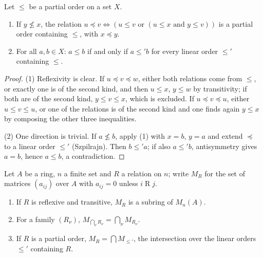 \begin{encadre}
\begin{theoreme}\label{thm:quillen-1973-5}
Let $\le$ be a partial order on a set $X$.
\begin{enumerate}
\item If $y \not\le x$, the relation $u \preceq v \iff (u \le v \text{ or } (u \le x \text{ and } y \le v))$ is a partial order containing $\le$, with $x \preceq y$.
\item For all $a, b \in X$: $a \le b$ if and only if $a \le' b$ for every linear order $\le'$ containing $\le$.
\end{enumerate}
\end{theoreme}
\end{encadre}

\begin{proof}
(1) Reflexivity is clear. If $u \preceq v \preceq w$, either both relations come from $\le$, or exactly one is of the second kind, and then $u \le x$, $y \le w$ by transitivity; if both are of the second kind, $y \le v \le x$, which is excluded. If $u \preceq v \preceq u$, either $u \le v \le u$, or one of the relations is of the second kind and one finds again $y \le x$ by composing the other three inequalities.

(2) One direction is trivial. If $a \not\le b$, apply (1) with $x = b$, $y = a$ and extend $\preceq$ to a linear order $\le'$ (Szpilrajn). Then $b \le' a$; if also $a \le' b$, antisymmetry gives $a = b$, hence $a \le b$, a contradiction.
\end{proof}

\begin{encadre}
\begin{theoreme}\label{thm:quillen-1973-5-b}
Let $A$ be a ring, $n$ a finite set and $R$ a relation on $n$; write $M_R$ for the set of matrices $(a_{ij})$ over $A$ with $a_{ij} = 0$ unless $i \mathrel{R} j$.
\begin{enumerate}
\item If $R$ is reflexive and transitive, $M_R$ is a subring of $M_n(A)$.
\item For a family $(R_\nu)$, $M_{\bigcap_\nu R_\nu} = \bigcap_\nu M_{R_\nu}$.
\item If $R$ is a partial order, $M_R = \bigcap M_{\le'}$, the intersection over the linear orders $\le'$ containing $R$.
\end{enumerate}
\end{theoreme}
\end{encadre}

